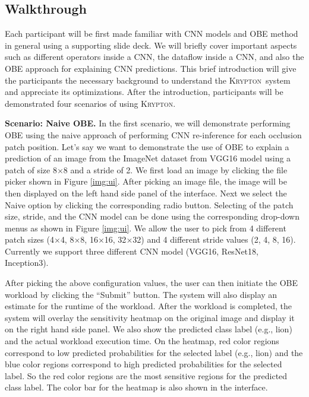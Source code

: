 \documentclass{vldb}
\newcommand{\system}{\textsc{Krypton}}
\begin{document}
\subsection{Walkthrough}
Each participant will be first made familiar with CNN models and OBE method in general using a supporting slide deck.
We will briefly cover important aspects such as different operators inside a CNN, the dataflow inside a CNN, and also the OBE approach for explaining CNN predictions.
This brief introduction will give the participants the necessary background to understand the \system~system and appreciate its optimizations.
After the introduction, participants will be demonstrated four scenarios of using \system.

\vspace{2mm}
\noindent \textbf{Scenario: Naive OBE.} In the first scenario, we will demonstrate performing OBE using the naive approach of performing CNN re-inference for each occlusion patch position.
Let's say we want to demonstrate the use of OBE to explain a prediction of an image from the ImageNet dataset from VGG16 model using a patch of size 8$\times$8 and a stride of 2.
We first load an image by clicking the file picker shown in Figure \ref{img:ui}.
After picking an image file, the image will be then displayed on the left hand side panel of the interface.
Next we select the Naive option by clicking the corresponding radio button.
Selecting of the patch size, stride, and the CNN model can be done using the corresponding drop-down menus as shown in Figure \ref{img:ui}.
We allow the user to pick from 4 different patch sizes (4$\times$4, 8$\times$8, 16$\times$16, 32$\times$32) and 4 different stride values (2, 4, 8, 16).
Currently we support three different CNN model (VGG16, ResNet18, Inception3).

After picking the above configuration values, the user can then initiate the OBE workload by clicking the ``Submit'' button.
The system will also display an estimate for the runtime of the workload.
After the workload is completed, the system will overlay the sensitivity heatmap on the original image and display it on the right hand side panel.
We also show the predicted class label (e.g., lion) and the actual workload execution time.
On the heatmap, red color regions correspond to low predicted probabilities for the selected label (e.g., lion) and the blue color regions correspond to high predicted probabilities for the selected label. So the red color regions are the most sensitive regions for the predicted class label.
The color bar for the heatmap is also shown in the interface.
\end{document}
